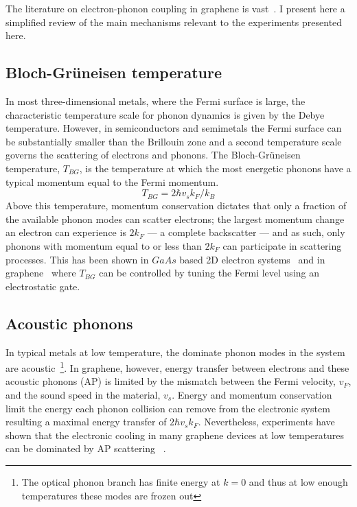 The literature on electron-phonon coupling in graphene is vast~\cite{sohier_phonon-limited_2014, tielrooij_out--plane_2017, viljas_electron-phonon_2010, bistritzer_electronic_2009, schiefele_temperature_2012}. I present here a simplified review of the main mechanisms relevant to the experiments presented here.

\subsection{Bloch-Gr{\"u}neisen temperature}
In most three-dimensional metals, where the Fermi surface is large, the characteristic temperature scale for phonon dynamics is given by the Debye temperature. However, in semiconductors and semimetals the Fermi surface can be substantially smaller than the Brillouin zone and a second temperature scale governs the scattering of electrons and phonons. The Bloch-Gr{\"u}neisen temperature, $T_{BG}$, is the temperature at which the most energetic phonons have a typical momentum equal to the Fermi momentum\cite{bloch_zum_1930, gruneisen_abhangigkeit_1933}.
\begin{equation}\label{eq:TBG}
T_{BG} = 2\hbar v_sk_F/k_B
\end{equation}
Above this temperature, momentum conservation dictates that only a fraction of the available phonon modes can scatter electrons; the largest momentum change an electron can experience is $2k_F$ --- a complete backscatter --- and as such, only phonons with momentum equal to or less than $2k_F$ can participate in scattering processes. This has been shown in $GaAs$ based 2D electron systems~\cite{stormer_observation_1990} and in graphene~\cite{efetov_controlling_2010} where $T_{BG}$ can be controlled by tuning the Fermi level using an electrostatic gate.

\subsection{Acoustic phonons}
In typical metals at low temperature, the dominate phonon modes in the system are acoustic~\cite{ashcroft_solid_1976}\footnote{The optical phonon branch has finite energy at $k=0$ and thus at low enough temperatures these modes are frozen out}. In graphene, however, energy transfer between electrons and these acoustic phonons (AP) is limited by the mismatch between the Fermi velocity, $v_F$, and the sound speed in the material, $v_s$. Energy and momentum conservation limit the energy each phonon collision can remove from the electronic system resulting a maximal energy transfer of $2\hbar v_sk_F$. Nevertheless, experiments have shown that the electronic cooling in many graphene devices at low temperatures can be dominated by AP scattering~\cite{fong_measurement_2013, betz_supercollision_2013, graham_photocurrent_2013} .

